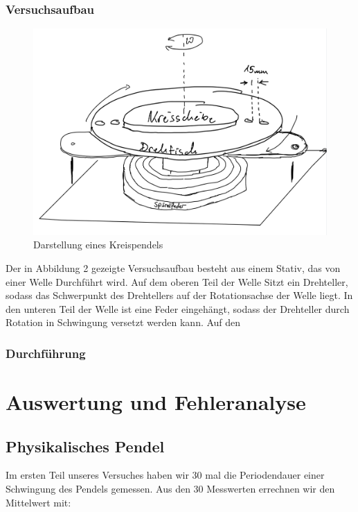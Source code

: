\documentclass[11pt,a4paper]{article}
\begin{document}
     \subsubsection{Versuchsaufbau}
     \begin{figure}[H]
     	\includegraphics[width=0.6\linewidth]{Drehpendel.png}
     	\centering
     	\caption{Darstellung eines Kreispendels}
     \end{figure}
 Der in Abbildung 2 gezeigte Versuchsaufbau besteht aus einem Stativ, das von einer Welle Durchführt wird. Auf dem oberen Teil der Welle Sitzt ein Drehteller, sodass das Schwerpunkt des Drehtellers auf der Rotationsachse der Welle liegt. In den unteren Teil der Welle ist eine Feder eingehängt, sodass der Drehteller durch Rotation in Schwingung versetzt werden kann. Auf den
     \subsubsection{Durchführung}









\section{Auswertung und Fehleranalyse}
	\subsection{Physikalisches Pendel}

	Im ersten Teil unseres Versuches haben wir 30 mal die Periodendauer einer Schwingung des Pendels
	gemessen. Aus den 30 Messwerten errechnen wir den Mittelwert mit:
\end{document}

